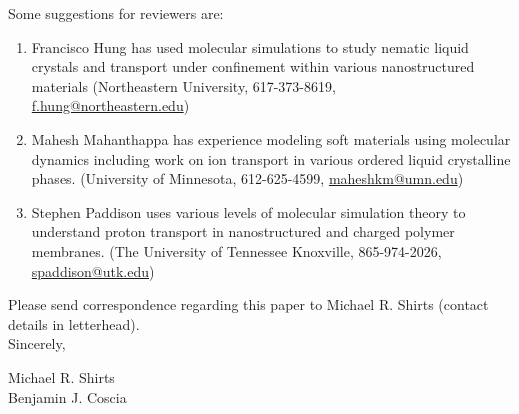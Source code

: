 \documentclass[fontsize=11pt]{article}
\begin{document}
	\noindent Some suggestions for reviewers are:
	\begin{enumerate}
	
		\item Francisco Hung has used molecular simulations to study nematic liquid crystals
		and transport under confinement within various nanostructured materials 
		(Northeastern University, 617-373-8619,\\ \href{mailto:f.hung@northeastern.edu}{f.hung@northeastern.edu})
		
		\item Mahesh Mahanthappa has experience modeling soft materials using molecular dynamics
		including work on ion transport in various ordered liquid crystalline phases. 
		(University of Minnesota, 612-625-4599, \href{mailto:maheshkm@umn.edu}{maheshkm@umn.edu})
		
		\item Stephen Paddison uses various levels of molecular simulation theory to understand
		proton transport in nanostructured and charged polymer membranes. (The University of Tennessee 
		Knoxville, 865-974-2026, \href{mailto:spaddison@utk.edu}{spaddison@utk.edu})
		
	\end{enumerate}
	
	\noindent Please send correspondence regarding this paper to Michael R. Shirts (contact
	details in letterhead).\\	
	
	\noindent Sincerely,
	
	\noindent Michael R. Shirts \\
	\noindent Benjamin J. Coscia \\
	
\end{document}
